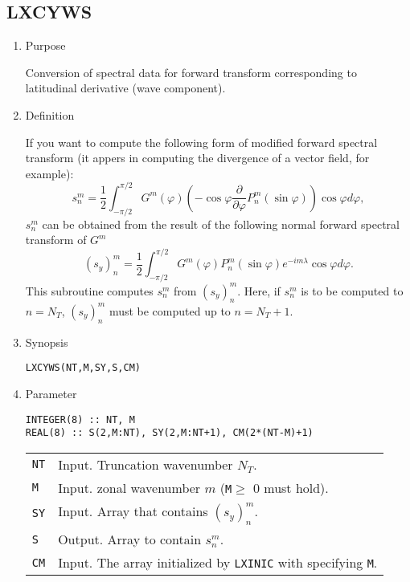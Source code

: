 \documentclass[a4paper]{scrartcl}
\begin{document}
\subsection{LXCYWS}

\begin{enumerate}

\item Purpose 

Conversion of spectral data for forward transform
corresponding to latitudinal derivative (wave component).

\item Definition

If you want to compute the following form of modified forward
spectral transform
(it appers in computing the divergence of a vector field, for example):
\begin{equation}
s^m_n=\frac1{2}\int^{\pi/2}_{-\pi/2}
G^m(\varphi)
\left(-\cos\varphi\frac{\partial}{\partial\varphi}P^m_n(\sin\varphi)\right)
\cos\varphi d\varphi,
\end{equation}
$s^m_n$ can be obtained from the result of 
the following normal forward spectral
transform of $G^m$
\begin{equation}
(s_y)^m_n=\frac1{2}\int^{\pi/2}_{-\pi/2}
G^m(\varphi)
P^m_n(\sin\varphi)
e^{-im\lambda}\cos\varphi d\varphi.
\end{equation}
This subroutine computes $s^m_n$ from $(s_y)^m_n$.
Here, if $s^m_n$ is to be computed to $n=N_T$, $(s_y)^m_n$
must be computed up to  $n=N_T+1$.

\item Synopsis
    
\texttt{LXCYWS(NT,M,SY,S,CM)}
  
\item Parameter

\begin{verbatim}
INTEGER(8) :: NT, M
REAL(8) :: S(2,M:NT), SY(2,M:NT+1), CM(2*(NT-M)+1)
\end{verbatim}
      
\begin{tabular}{ll}
\texttt{NT} & Input. Truncation wavenumber $N_T$.\\
\texttt{M} & Input. zonal wavenumber $m$ 
(\texttt{M}$\ge$ 0 must hold).\\
\texttt{SY} & Input. Array that contains $(s_y)^m_n$.\\
\texttt{S} & Output. Array to contain $s^m_n$.\\
\texttt{CM}  & Input. The array initialized by \texttt{LXINIC}
with specifying \texttt{M}.
\end{tabular}


\end{enumerate}
\end{document}
